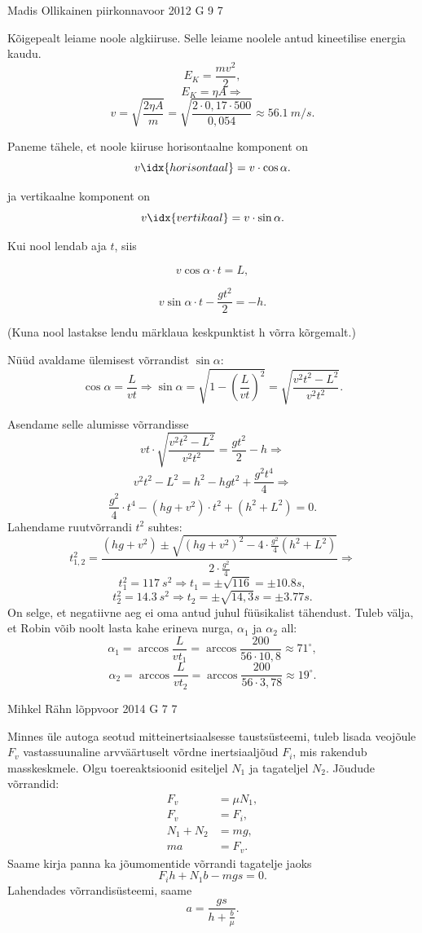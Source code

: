 \documentclass[11pt]{article}
\begin{document}
{%
{Madis Ollikainen} %
{piirkonnavoor} %
{2012} %
{G 9} %
{7} %
{

\ifSolution
Kõigepealt leiame noole algkiiruse. Selle leiame noolele antud kineetilise energia kaudu.
$$ E_{K}=\frac{m v^2}{2},$$
$$E_{K}=\eta A \Rightarrow$$
$$v=\sqrt{\frac{2\eta A}{m}}=\sqrt{\frac{2\cdot0,17\cdot 500}{0,054}}\approx \SI{56,1}{m/s}.$$

Paneme tähele, et noole kiiruse horisontaalne komponent on
$$v\idx{horisontaal}=v\cdot \cos\alpha.$$

ja vertikaalne komponent on
$$v\idx{vertikaal}=v\cdot \sin\alpha.$$

Kui nool lendab aja $t$, siis 

$$v \cos\alpha\cdot t=L,$$

$$v \sin\alpha\cdot t-\frac{g t^2}{2}=-h. $$

(Kuna nool lastakse lendu märklaua keskpunktist h võrra kõrgemalt.)

Nüüd avaldame ülemisest võrrandist $\sin\alpha$:
$$\cos\alpha=\frac{L}{vt} \Rightarrow \sin\alpha=\sqrt{1-\left(\frac{L}{vt}\right)^2}=\sqrt{\frac{v^2t^2-L^2}{v^2t^2}}.$$


Asendame selle alumisse võrrandisse
$$vt\cdot \sqrt{\frac{v^2t^2-L^2}{v^2t^2}}=\frac{g t^2}{2}-h \Rightarrow$$
$$v^2t^2-L^2=h^2 - hgt^2+\frac{g^2 t^4}{4} \Rightarrow$$
$$\frac{g^2}{4}\cdot t^4 - \left(hg+v^2\right)\cdot t^2 + \left(h^2+L^2\right)=0.$$
Lahendame ruutvõrrandi $t^2$ suhtes:
$$t^2_{1,2}=\frac{\left(hg+v^2\right)\pm\sqrt{\left(hg+v^2\right)^2-4\cdot \frac{g^2}{4}\left(h^2+L^2\right)}}{2\cdot \frac{g^2}{4}} \Rightarrow$$
$$t^2_{1}=\SI{117}{s^2} \Rightarrow t_{1}=\pm\sqrt{116}=\pm \SI{10,8}s,$$
$$t^2_{2}=\SI{14,3}{s^2} \Rightarrow t_{2}=\pm \sqrt{14,3}\SI{}s=\pm \SI{3,77}s.$$
On selge, et negatiivne aeg ei oma antud juhul füüsikalist tähendust. Tuleb välja, et Robin võib noolt lasta kahe erineva nurga, 
$\alpha_{1}$ ja $\alpha_{2}$ all:
$$\alpha_{1}= \arccos\frac{L}{vt_{1}}=\arccos\frac{200}{56\cdot10,8}\approx 71^\circ ,$$
$$\alpha_{2}=\arccos\frac{L}{vt_{2}}=\arccos\frac{200}{56\cdot3,78}\approx 19^\circ .$$
\fi
}

{Mihkel Rähn} %
{lõppvoor} %
{2014} %
{G 7} %
{7} %
{

\ifSolution
Minnes üle autoga seotud mitteinertsiaalsesse taustsüsteemi, tuleb lisada veojõule $F_v$ vastassuunaline arvväärtuselt võrdne inertsiaaljõud $F_i$, mis rakendub masskeskmele. Olgu toereaktsioonid esiteljel $N_1$ ja tagateljel $N_2$. Jõudude võrrandid:
\[
\begin{aligned}
F_v&=\mu N_1,\\
F_v&=F_i,\\
N_1+N_2&=mg,\\
ma&=F_v. 
\end{aligned}
\]
Saame kirja panna ka jõumomentide võrrandi tagatelje jaoks 
\[
F_ih+N_1b-mgs=0.
\]
Lahendades võrrandisüsteemi, saame
\[
a=\frac{gs}{h+\frac{b}{\mu}}.
\]
\fi
}

}
\end{document}
